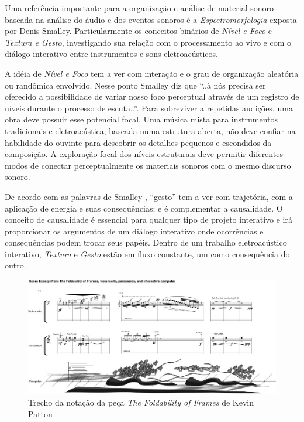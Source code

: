 \documentclass{ppgmus}
\begin{document}
Uma referência importante para a organização e análise de material sonoro baseada
na análise do áudio e dos eventos sonoros é a \textit{Espectromorfologia} exposta por Denis
Smalley. Particularmente os conceitos binários de \textit{Nível e Foco} e \textit{Textura e Gesto},
investigando sua relação com o processamento ao vivo e com o diálogo interativo entre
instrumentos e sons eletroacústicos.

A idéia de \textit{Nível e Foco} tem a ver com interação e o grau de organização aleatória
ou randômica envolvido. Nesse ponto Smalley diz que ``..à nós precisa ser oferecido
a possibilidade de variar nosso foco perceptual através de um registro de níveis 
durante o processo de escuta..''. Para sobreviver a repetidas audições, uma obra deve 
possuir esse potencial focal. Uma música mista para instrumentos tradicionais e eletroacústica, 
baseada numa estrutura aberta, não deve confiar na habilidade do ouvinte para descobrir
os detalhes pequenos e escondidos da composição. A exploração focal dos níveis estruturais
deve permitir diferentes modos de conectar perceptualmente os materiais sonoros com 
o mesmo discurso sonoro. 

De acordo com as palavras de Smalley \cite{emmersonsimon:86}, ``gesto'' tem a ver 
com trajetória, com a aplicação de energia e suas consequências; e é complementar
a causalidade. O conceito de causalidade
é essencial para qualquer tipo de projeto interativo e irá proporcionar os argumentos
de um diálogo interativo onde ocorrências e consequências podem trocar seus papéis.
Dentro de um trabalho eletroacústico interativo, \textit{Textura} e \textit{Gesto} 
estão em fluxo constante, um como consequência do outro. 

\begin{figure}
\includegraphics[scale=.5]{espectromorfologia}
\caption{Trecho da notação da peça \textit{The Foldability of Frames} de Kevin Patton }
\label{espectromorfologia}
\end{figure}
\end{document}
